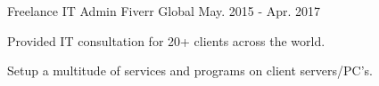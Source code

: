 \begin{cventries}
  \cventry
    {Freelance IT Admin} %
    {Fiverr} %
    {Global} %
    {May. 2015 - Apr. 2017} %
    {
      \begin{cvitems} %
      	\item {Provided IT consultation for 20+ clients across the world.}
	\item {Setup a multitude of services and programs on client servers/PC's.}
      \end{cvitems}
    }

\end{cventries}
